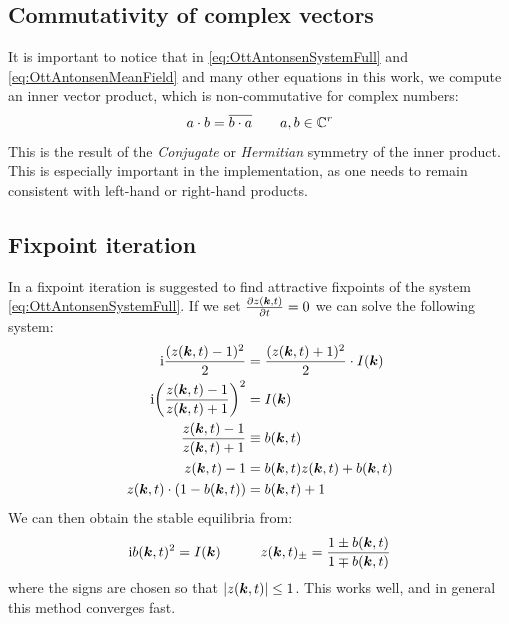 \subsection{Commutativity of complex vectors} 
It is important to notice that in \eqref{eq:OttAntonsenSystemFull} and \eqref{eq:OttAntonsenMeanField} and many other equations in this work, we compute an inner vector product, which is non-commutative for complex numbers:
\begin{align}
a \cdot b = \overline{b \cdot a} \qquad a, b \in {\mathbb{C}}^r
\end{align}
This is the result of the \textsl{Conjugate} or \textsl{Hermitian} symmetry of the inner product. This is especially important in the \matlab implementation, as one needs to remain consistent with left-hand or right-hand products.



\subsection{Fixpoint iteration}
In \cite{OttAntonsen2017} a fixpoint iteration is suggested to find attractive fixpoints of the system \eqref{eq:OttAntonsenSystemFull}. If we set $\frac{\partial z({\boldsymbol{k}}, t)}{\partial t} = 0$ we can solve the following system:
\begin{align}
\ic \frac{(z(\k, t)-1)^{2}}{2} &= \frac{(z(\k, t)+1)^{2}}{2} \cdot I(\k) \nonumber \\
\ic \left(\frac{z(\k, t)-1}{z(\k, t)+1}\right)^2 &= I(\k) \nonumber \\
\frac{z(\k, t)-1}{z(\k, t)+1} &\equiv b(\k,t) \nonumber \\
z(\k, t) - 1 &= b(\k,t) z(\k, t) + b(\k,t)  \nonumber \\
z(\k, t) \cdot (1 - b(\k,t)) &= b(\k,t)  + 1\nonumber
\end{align}
We can then obtain the stable equilibria from:
\begin{align}
\ic b(\k,t)^2 = I(\k) \hspace{10mm} z(\k, t)_{\pm} = \frac{1 \pm b(\k,t)}{1 \mp b(\k,t)} \label{eq:fixedpointiterations} 
\end{align}
where the signs are chosen so that $\vert z({\boldsymbol{k}}, t) \vert \leq 1$. This works well, and in general this method converges fast.


